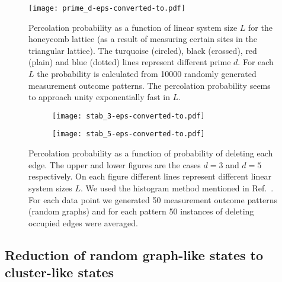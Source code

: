 \documentclass[aps,amsfonts,pra,twocolumn,showpacs]{revtex4-1}
\begin{document}
	
	\begin{figure}[t]
		\centering
		\texttt{[image: prime\_d-eps-converted-to.pdf]}
		\caption{Percolation probability as a function of linear system size $L$ for the honeycomb lattice (as a result of measuring certain sites in the triangular lattice). The turquoise (circled), black (crossed), red (plain) and blue (dotted) lines represent different prime $d$. For each $L$ the probability is calculated from 10000 randomly generated measurement outcome patterns. The percolation probability seems to approach unity exponentially fast in $L$.}
		\label{numerical}
	\end{figure}
	
	\begin{figure}[h]
		\begin{subfigure}{0.48\textwidth}
			\centering
			\texttt{[image: stab\_3-eps-converted-to.pdf]}
		\end{subfigure}
		\vspace{1mm}
		\begin{subfigure}{0.48\textwidth}
			\centering
			\texttt{[image: stab\_5-eps-converted-to.pdf]}
		\end{subfigure}
		\caption{Percolation probability as a function of probability of deleting each edge. The upper and lower figures are the cases $d=3$ and $d=5$ respectively. On each figure different lines represent different linear system sizes $L$. We used the histogram method mentioned in Ref.~\cite{Newman2001}. For each data point we generated 50 measurement outcome patterns (random graphs) and for each pattern 50 instances of deleting occupied edges were averaged.}
		\label{fig:stab}
	\end{figure}
	
	
	\subsection{Reduction of random graph-like states to cluster-like states} \label{sec:rules}
\end{document}
